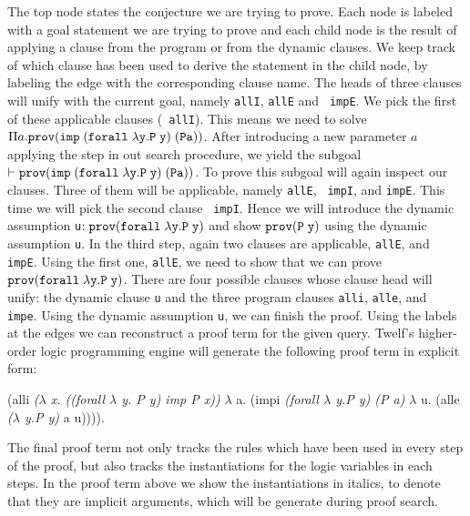 \documentclass{acmconf}
\newcommand{\mygray}[1]{\em #1}
\newcommand{\pfLF}{\tt{prov}}
\newcommand{\impLF}{\tt{imp}\;}
\newcommand{\forallLF}{\tt{forall}\;}
\newcommand{\vd}{\vdash}
\begin{document}
The top node states the conjecture we are trying to prove. 
Each node is labeled with a goal statement we are trying to prove and
each child node is the result of applying a clause from the program or
from the dynamic clauses. We keep track of which clause has been used
to derive the statement in the child node, by labeling the edge with
the corresponding clause name. The heads of three clauses will unify
with the current goal, namely {\tt allI}, {\tt allE} and {\tt
  impE}. We pick the first of these applicable clauses ({\tt
  allI}). This means we need to solve $\Pi a. \pfLF ( \impLF
(\forallLF \lambda y. P\; y)\; (P a))$. After introducing a new
parameter $a$ applying the {} step in out search
procedure, we yield the subgoal $\vd \pfLF ( \impLF (\forallLF \lambda
y. P\; y)\; (P a))$. To prove this subgoal will again inspect our
clauses. Three of them will be applicable, namely {\tt allE}, {\tt
  impI}, and {\tt impE}. This time we will pick the second clause {\tt
  impI}. Hence we will introduce the dynamic assumption {\tt{u}}$ :
\pfLF (\forallLF \lambda y. P\; y)$ and show $\pfLF (P\; y)$ using the
dynamic assumption {\tt{u}}. In the third step, 
again two clauses are applicable,  {\tt allE}, and {\tt
  impE}. Using the first one, {\tt allE}, we need to show that we can
prove $\pfLF (\forallLF \lambda y. P\; y)$. There are four
possible clauses whose clause head will unify: the dynamic clause
{\tt u} and the three program clauses {\tt alli}, {\tt alle}, and {\tt
  impe}. Using the dynamic assumption {\tt u}, we can finish the
proof. Using the labels at the edges we can reconstruct a proof term
for the given query. Twelf's higher-order logic programming engine
will generate the following proof term in explicit form:

\begin{code}
(alli {\mygray{($\lambda\!\!$ x. ((forall $\lambda\!\!$ y. P y) imp P x))}}
   $\lambda\!\!$ a. (impi {\mygray{(forall $\lambda\!\!$ y.P y) (P a)}}
           $\lambda\!\!$ u. (alle {\mygray{($\lambda\!\!$ y.P y)}} a u)))).
\end{code}

The final proof term not only tracks the rules which have been used in
every step of the proof, but also tracks the instantiations for the logic
variables in each steps. In the proof term above we show the
instantiations in italics, to denote that they are implicit arguments,
which will be generate during proof search.
\end{document}
